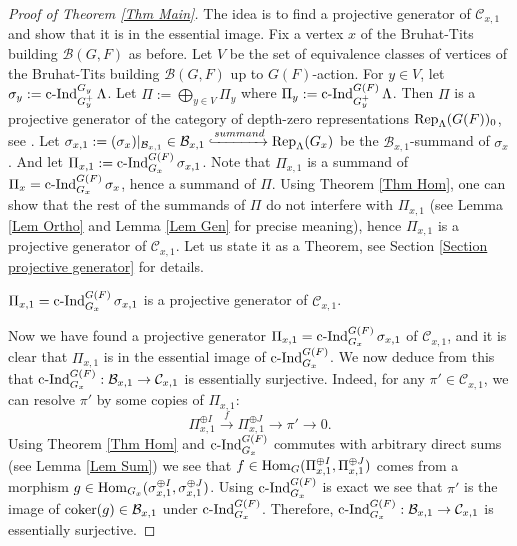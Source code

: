 \begin{proof}[Proof of Theorem \ref{Thm Main}]
			The idea is to find a projective generator of $\mathcal{C}_{x,1}$ and show that it is in the essential image. Fix a vertex $x$ of the Bruhat-Tits building $\mathcal{B}(G, F)$ as before. Let $V$ be the set of equivalence classes of vertices of the Bruhat-Tits building $\mathcal{B}(G, F)$ up to $G(F)$-action. For $y \in V$, let $\sigma_y:=\operatorname{\operatorname{c-Ind}}_{G_y^+}^{G_y}\Lambda$. Let $\Pi:=\bigoplus_{y \in V}\Pi_y$ where $\Pi_y:=\operatorname{\operatorname{c-Ind}}_{G_y^+}^{G(F)}\Lambda$. Then $\Pi$ is a projective generator of the category of depth-zero representations $\operatorname{\operatorname{Rep}}_{\Lambda}(G(F))_0$, see \cite[Appendix]{dat2009finitude}. Let $\sigma_{x,1}:=(\sigma_x)|_{\mathcal{B}_{x,1}} \in \mathcal{B}_{x,1} \xhookrightarrow{summand} \operatorname{\operatorname{Rep}}_{\Lambda}(G_x)$ be the $\mathcal{B}_{x,1}$-summand of $\sigma_x$. And let $\Pi_{x,1}:=\operatorname{\operatorname{c-Ind}}_{G_x}^{G(F)}\sigma_{x,1}$. Note that $\Pi_{x,1}$ is a summand of $\Pi_x=\operatorname{\operatorname{c-Ind}}_{G_x}^{G(F)}\sigma_x$, hence a summand of $\Pi$. Using Theorem \ref{Thm Hom}, one can show that the rest of the summands of $\Pi$ do not interfere with $\Pi_{x,1}$ (see Lemma \ref{Lem Ortho} and Lemma \ref{Lem Gen} for precise meaning), hence $\Pi_{x,1}$ is a projective generator of $\mathcal{C}_{x,1}$. Let us state it as a Theorem, see Section \ref{Section projective generator} for details.
			
			\begin{theorem}\label{Thm Proj}
				$\Pi_{x,1}=\operatorname{\operatorname{c-Ind}}_{G_x}^{G(F)}\sigma_{x,1}$ is a projective generator of $\mathcal{C}_{x,1}$.
			\end{theorem}
			
			Now we have found a projective generator $\Pi_{x,1}=\operatorname{\operatorname{c-Ind}}_{G_x}^{G(F)}\sigma_{x,1}$ of $\mathcal{C}_{x,1}$, and it is clear that $\Pi_{x,1}$ is in the essential image of $\operatorname{\operatorname{c-Ind}}_{G_x}^{G(F)}$. We now deduce from this that $\operatorname{\operatorname{c-Ind}}_{G_x}^{G(F)}: \mathcal{B}_{x,1} \to \mathcal{C}_{x,1}$ is essentially surjective. Indeed, for any $\pi' \in \mathcal{C}_{x,1}$, we can resolve $\pi'$ by some copies of $\Pi_{x,1}$:
			$$\Pi_{x,1}^{\oplus I} \xrightarrow{f} \Pi_{x,1}^{\oplus J} \to \pi' \to 0.$$
			Using Theorem \ref{Thm Hom} and $\operatorname{\operatorname{c-Ind}}_{G_x}^{G(F)}$ commutes with arbitrary direct sums (see Lemma \ref{Lem Sum}) we see that $f \in \operatorname{\operatorname{Hom}}_G(\Pi_{x,1}^{\oplus I}, \Pi_{x,1}^{\oplus J})$ comes from a morphism $g \in \operatorname{\operatorname{Hom}}_{G_x}(\sigma_{x,1}^{\oplus I}, \sigma_{x,1}^{\oplus J})$. Using $\operatorname{\operatorname{c-Ind}}_{G_x}^{G(F)}$ is exact we see that $\pi'$ is the image of $\operatorname{coker}(g) \in \mathcal{B}_{x,1}$ under $\operatorname{\operatorname{c-Ind}}_{G_x}^{G(F)}$. Therefore, $\operatorname{\operatorname{c-Ind}}_{G_x}^{G(F)}: \mathcal{B}_{x,1} \to \mathcal{C}_{x,1}$ is essentially surjective.
			
		\end{proof}
		
